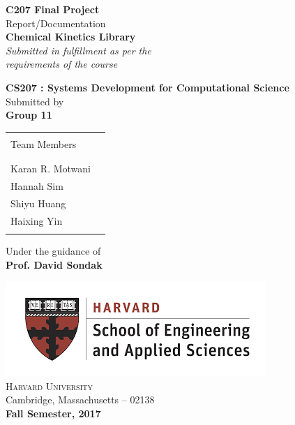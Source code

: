 \begin{titlepage}

\begin{center}

\textup{\large {\bf C207 Final Project} \\ Report/Documentation}\\[0.2in]

\Large \textbf {Chemical Kinetics Library}\\[0.3in]

       \small \emph{Submitted in fulfillment as per the\\
        requirements of the course}
        \vspace{.2in}

       {\bf CS207 : Systems Development for Computational Science}\\[0.3in]

\normalsize Submitted by \\
\large \textbf{Group 11} \\
\begin{table}[h]
\centering
\begin{tabular}{lr}\hline \\
Team Members \\ \\ \hline
\\
Karan R. Motwani\\
Hannah Sim\\ 
Shiyu Huang\\
Haixing Yin\\ \\ \hline 
\end{tabular}
\end{table}

\vspace{.1in}
Under the guidance of\\
{\textbf{Prof. David Sondak}}\\[0.2in]

\vfill

\includegraphics[scale=0.65]{logo}\\[0.1in]
\normalsize
\textsc{Harvard University}\\
Cambridge, Massachusetts -- 02138 \\
\vspace{0.3cm}
\textbf{Fall Semester, 2017}
\end{center}

\end{titlepage}
